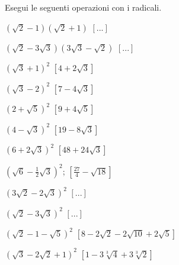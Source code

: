 \begin{esercizio}[\Ast]
 \label{ese:2.55}
Esegui le seguenti operazioni con i radicali.
 \begin{multicols}{2}
 \begin{enumeratea}
 \item $(\sqrt 2-1)(\sqrt 2+1)$
  \hfill $\left[...\right]$
 \item $(\sqrt 2-3\sqrt 3)(3\sqrt 3-\sqrt 2)$
  \hfill $\left[...\right]$
 \item $(\sqrt 3+1)^2$
  \hfill $\left[4+2\sqrt 3\right]$
 \item $(\sqrt 3-2)^2$
  \hfill $\left[7-4\sqrt 3\right]$
 \item $(2+\sqrt 5)^2$
  \hfill $\left[9+4\sqrt 5\right]$
 \item $(4-\sqrt 3)^2$
  \hfill $\left[19-8\sqrt 3\right]$
 \item $(6+2\sqrt 3)^2$
  \hfill $\left[48+24\sqrt 3\right]$
 \item $(\sqrt 6-\frac 1 2\sqrt 3)^2$;
  \hfill $\left[\frac{27} 4-\sqrt{18}\right]$
 \item $(3\sqrt 2-2\sqrt 3)^2$
  \hfill $\left[...\right]$
 \item $(\sqrt 2-3\sqrt 3)^2$
  \hfill $\left[...\right]$
 \item $(\sqrt 2-1-\sqrt 5)^2$
  \hfill $\left[8-2\sqrt 2-2\sqrt{10}+2\sqrt 5\right]$
 \item $(\sqrt 3-2\sqrt 2+1)^2$
  \hfill $\left[1-3\sqrt[3]4+3\sqrt[3]2\right]$

\end{enumeratea}
\end{multicols}
\end{esercizio}
